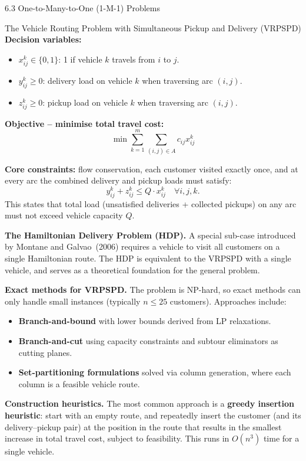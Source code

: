 \documentclass[aspectratio=169,10pt]{beamer}
\begin{document}
\begin{frame}[allowframebreaks]{6.3 One-to-Many-to-One (1-M-1) Problems}
\begin{block}{The Vehicle Routing Problem with Simultaneous Pickup and Delivery (VRPSPD)}
    \medskip
    \textbf{Decision variables:}
    \begin{itemize}
      \item $x_{ij}^k \in \{0,1\}$: 1 if vehicle $k$ travels from $i$ to $j$.
      \item $y_{ij}^k \geq 0$: delivery load on vehicle $k$ when traversing arc $(i,j)$.
      \item $z_{ij}^k \geq 0$: pickup load on vehicle $k$ when traversing arc $(i,j)$.
    \end{itemize}

    \textbf{Objective -- minimise total travel cost:}
    \[
      \min \sum_{k=1}^{m} \sum_{(i,j) \in A} c_{ij} x_{ij}^k
    \]

    \textbf{Core constraints:} flow conservation, each customer visited exactly once,
    and at every arc the combined delivery and pickup loads must satisfy:
    \[
      y_{ij}^k + z_{ij}^k \leq Q \cdot x_{ij}^k \quad \forall i,j,k.
    \]
    This states that total load (unsatisfied deliveries + collected pickups) on any arc
    must not exceed vehicle capacity $Q$.
  \end{block}

  \framebreak

  \textbf{The Hamiltonian Delivery Problem (HDP).} A special sub-case introduced by
  Montane and Galvao~(2006) requires a vehicle to visit all customers on a single Hamiltonian
  route.  The HDP is equivalent to the VRPSPD with a single vehicle, and serves as a
  theoretical foundation for the general problem.

  \textbf{Exact methods for VRPSPD.} The problem is NP-hard, so exact methods can only
  handle small instances (typically $n \leq 25$ customers). Approaches include:
  \begin{itemize}
    \item \textbf{Branch-and-bound} with lower bounds derived from LP relaxations.
    \item \textbf{Branch-and-cut} using capacity constraints and subtour eliminators
          as cutting planes.
    \item \textbf{Set-partitioning formulations} solved via column generation, where
          each column is a feasible vehicle route.
  \end{itemize}

  \textbf{Construction heuristics.}  The most common approach is a \textbf{greedy insertion
  heuristic}: start with an empty route, and repeatedly insert the customer (and its
  delivery--pickup pair) at the position in the route that results in the smallest
  increase in total travel cost, subject to feasibility. This runs in $O(n^3)$ time
  for a single vehicle.


\end{frame}
\end{document}
